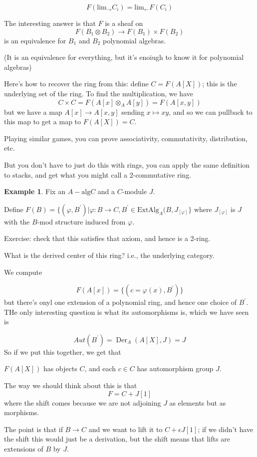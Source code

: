 \documentclass{amsart}
\theoremstyle{definition}
\newtheorem{example}[dummy]{Example}
\DeclareMathOperator{\Der}{Der}
\newcommand{\alg}{\text{alg}}
\newcommand{\Aut}{Aut}
\begin{document}
$$F(\text{lim}_\to C_i)=\text{lim}_{\leftarrow} F(C_i)$$

The interesting answer is that $F$ is a sheaf on 
$$F(B_1\otimes B_2)\to F(B_1)\times F(B_2)$$
is an equivalence for $B_1$ and $B_2$ polynomial algebras.

(It is an equivalence for everything, but it's enoiugh to know it for polynomial algebras)

Here's how to recover the ring from this: define $C=F(A[X])$; this is the underlying set of the ring.  To find the multiplication, we have $$C\times C=F(A[x]\otimes_A A[y])=F(A[x,y])$$
but we have a map $A[x]\to A[x,y]$ sending $x\mapsto xy$, and so we can pullback to this map to get a map to $F(A[X])=C$.

Playing similar games, you can prove associativity, commutativity, distribution, etc.

But you don't have to just do this with rings, you can apply the same definition to stacks, and get what you might call a 2-commutative ring.

\begin{example}
Fix an $A-\alg C$ and a $C$-module $J$.

Define $F(B)=\{ (\varphi, B^\prime)|\varphi:B\to C, B^\prime\in\text{ExtAlg}_A(B, J_{[\varphi]}\}$
where $J_{[\varphi]}$ is $J$ with the $B$-mod structure induced from $\varphi$.

Exercise: check that this satisfies that axiom, and hence is a 2-ring.

What is the derived center of this ring?  i.e., the underlying category.

We compute

$$F(A[x])=\{(c=\varphi(x), B^\prime)\}$$
but there's onyl one extension of a polynomial ring, and hence one choice of $B^\prime$.  THe only interesting question is what its automorphisms is, which we have seen is

$$\Aut(B^\prime)=\Der_A(A[X], J)=J$$
So if we put this together, we get that

$F(A[X])$ has objects $C$, and each $c\in C$ has automorphism group $J$.

The way we should think about this is that 
$$F=C+J[1]$$
where the shift comes because we are not adjoining $J$ as elements but as morphisms.

The point is that if $B\to C$ and we want to lift it to $C+\epsilon J[1]$; if we didn't have the shift this would just be a derivation, but the shift means that lifts are extensions of $B$ by $J$.
\end{example}
\end{document}
